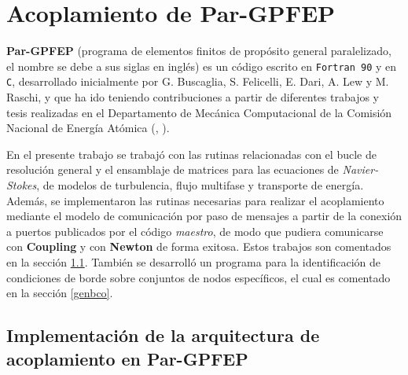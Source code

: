 \chapter{Acoplamiento de \textbf{Par-GPFEP}}
\label{C:pargpfep}

\textbf{Par-GPFEP} (programa de elementos finitos de propósito general paralelizado, el nombre se debe a sus siglas
en inglés)
es un código escrito en \texttt{Fortran 90} y en \texttt{C},
desarrollado inicialmente por G. Buscaglia, S. Felicelli, E. Dari, A. Lew y M. Raschi,
y que ha ido teniendo contribuciones a partir de diferentes trabajos y tesis realizadas
en el Departamento de Mecánica Computacional de la Comisión Nacional de Energía Atómica (\cite{gpfep}, \cite{pargpfep}).

En el presente trabajo se trabajó con las rutinas relacionadas con el bucle de resolución general
y el ensamblaje de matrices para las ecuaciones de \textit{Navier-Stokes}, de modelos de turbulencia, flujo multifase y transporte de energía.
Además, se implementaron las rutinas necesarias para realizar el acoplamiento mediante el modelo de comunicación por paso de mensajes
a partir de la conexión a puertos publicados por el código \textit{maestro}, de modo que pudiera comunicarse con \textbf{Coupling} y con \textbf{Newton} de forma exitosa.
Estos trabajos son comentados en la sección \ref{pargpfep-impl}.
También se desarrolló un programa para la identificación de condiciones de borde sobre conjuntos de nodos específicos, el cual es comentado en la sección \ref{genbco}.

\section{Implementación de la arquitectura de acoplamiento en \textbf{Par-GPFEP}}
\label{pargpfep-impl}

